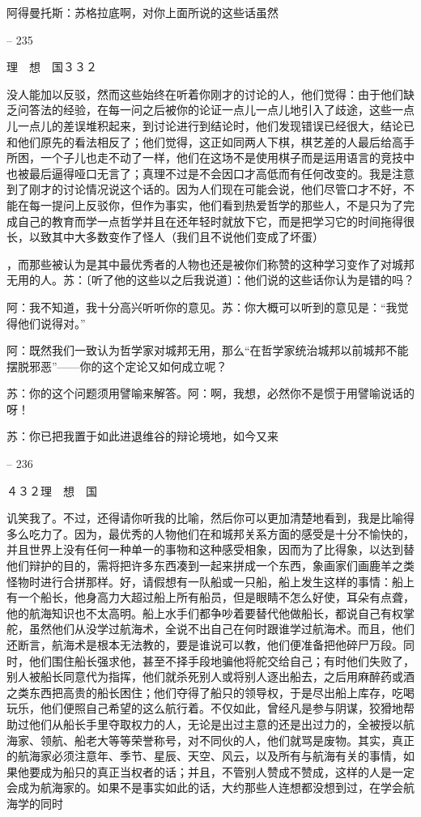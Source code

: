 \documentclass[11pt,oneside]{book}
\begin{document}
\begin{common-format}
    阿得曼托斯：苏格拉底啊，对你上面所说的这些话虽然

    

-- 235

    理　想　国３３２

    没人能加以反驳，然而这些始终在听着你刚才的讨论的人，他们觉得：由于他们缺乏问答法的经验，在每一问之后被你的论证一点儿一点儿地引入了歧途，这些一点儿一点儿的差误堆积起来，到讨论进行到结论时，他们发现错误已经很大，结论已和他们原先的看法相反了；他们觉得，这正如同两人下棋，棋艺差的人最后给高手所困，一个子儿也走不动了一样，他们在这场不是使用棋子而是运用语言的竞技中也被最后逼得哑口无言了；真理不过是不会因口才高低而有任何改变的。我是注意到了刚才的讨论情况说这个话的。因为人们现在可能会说，他们尽管口才不好，不能在每一提问上反驳你，但作为事实，他们看到热爱哲学的那些人，不是只为了完成自己的教育而学一点哲学并且在还年轻时就放下它，而是把学习它的时间拖得很长，以致其中大多数变作了怪人（我们且不说他们变成了坏蛋）

    ，而那些被认为是其中最优秀者的人物也还是被你们称赞的这种学习变作了对城邦无用的人。苏：〔听了他的这些以之后我说道〕：他们说的这些话你认为是错的吗？

    阿：我不知道，我十分高兴听听你的意见。苏：你大概可以听到的意见是：“我觉得他们说得对。”

    阿：既然我们一致认为哲学家对城邦无用，那么“在哲学家统治城邦以前城邦不能摆脱邪恶”——你的这个定论又如何成立呢？

    苏：你的这个问题须用譬喻来解答。阿：啊，我想，必然你不是惯于用譬喻说话的呀！

    苏：你已把我置于如此进退维谷的辩论境地，如今又来

    

-- 236

    ４３２理　想　国

    讥笑我了。不过，还得请你听我的比喻，然后你可以更加清楚地看到，我是比喻得多么吃力了。因为，最优秀的人物他们在和城邦关系方面的感受是十分不愉快的，并且世界上没有任何一种单一的事物和这种感受相象，因而为了比得象，以达到替他们辩护的目的，需将把许多东西凑到一起来拼成一个东西，象画家们画鹿羊之类怪物时进行合拼那样。好，请假想有一队船或一只船，船上发生这样的事情：船上有一个船长，他身高力大超过船上所有船员，但是眼睛不怎么好使，耳朵有点聋，他的航海知识也不太高明。船上水手们都争吵着要替代他做船长，都说自己有权掌舵，虽然他们从没学过航海术，全说不出自己在何时跟谁学过航海术。而且，他们还断言，航海术是根本无法教的，要是谁说可以教，他们便准备把他碎尸万段。同时，他们围住船长强求他，甚至不择手段地骗他将舵交给自己；有时他们失败了，别人被船长同意代为指挥，他们就杀死别人或将别人逐出船去，之后用麻醉药或酒之类东西把高贵的船长困住；他们夺得了船只的领导权，于是尽出船上库存，吃喝玩乐，他们便照自己希望的这么航行着。不仅如此，曾经凡是参与阴谋，狡猾地帮助过他们从船长手里夺取权力的人，无论是出过主意的还是出过力的，全被授以航海家、领航、船老大等等荣誉称号，对不同伙的人，他们就骂是废物。其实，真正的航海家必须注意年、季节、星辰、天空、风云，以及所有与航海有关的事情，如果他要成为船只的真正当权者的话；并且，不管别人赞成不赞成，这样的人是一定会成为航海家的。如果不是事实如此的话，大约那些人连想都没想到过，在学会航海学的同时


\end{common-format}
\end{document}
